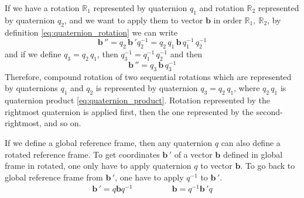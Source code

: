 If we have a rotation $\mathbb{R}_1$ represented by quaternion $q_1$ and rotation $\mathbb{R}_2$ represented by quaternion $q_2$, and we want to apply them to vector $\boldsymbol{b}$ in order $\mathbb{R}_1,\ \mathbb{R}_2$, by definition \eqref{eq:quaternion_rotation} we can write
\begin{equation}
	\boldsymbol{b}\,''
	= q_2\, \boldsymbol{b}\,' q_2^{-1} 
	= q_2\, q_1\, \boldsymbol{b}\, q_1^{-1}\, q_2^{-1}
\end{equation}
and if we define $q_3 = q_2\, q_1$, then $q_3^{-1} = q_1^{-1}\, q_2^{-1}$ and then
\begin{equation}
	\boldsymbol{b}\,'' = q_3\, \boldsymbol{b}\, q_3^{-1}
\end{equation}
Therefore, compound rotation of two sequential rotations which are represented by quaternions $q_1$ and $q_2$ is represented by quaternion $q_3 = q_2\, q_1$, where $q_2\, q_1$ is quaternion product \eqref{eq:quaternion_product}. Rotation represented by the rightmost quaternion is applied first, then the one represented by the second-rightmost, and so on.

If we define a global reference frame, then any quaternion $q$ can also define a rotated reference frame. To get coordinates $\boldsymbol{b}\,'$ of a vector $\boldsymbol{b}$ defined in global frame in rotated, one only have to apply quaternion $q$ to vector $\boldsymbol{b}$. To go back to global reference frame from $\boldsymbol{b}\,'$, one have to apply $q^{-1}$ to $\boldsymbol{b}\,'$.
\begin{equation}
	\begin{aligned}
		\boldsymbol{b}\,' = q \boldsymbol{b} q^{-1}
	\end{aligned}
	\qquad
	\qquad
	\begin{aligned}
		\boldsymbol{b} = q^{-1} \boldsymbol{b}\,' q
	\end{aligned}
\end{equation}